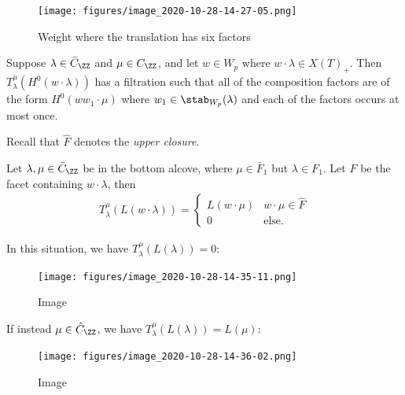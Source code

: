 \begin{figure}
\centering
\texttt{[image: figures/image\_2020-10-28-14-27-05.png]}
\caption{Weight where the translation has six factors}
\end{figure}

\begin{proposition}[?]

Suppose \(\lambda \in \bar{C}_\ZZ\) and \(\mu \in C_\ZZ\), and let
\(w\in W_p\) where \(w\cdot \lambda \in X(T)_+\). Then
\(T_\lambda^\mu (H^0(w\cdot \lambda))\) has a filtration such that all
of the composition factors are of the form \(H^0(ww_1 \cdot \mu)\) where
\(w_1\in \stab_{W_p}(\lambda)\) and each of the factors occurs at most
once.

\end{proposition}

Recall that \(\hat F\) denotes the \emph{upper closure}.

\begin{proposition}[?]

Let \(\lambda, \mu \in \bar{C}_\ZZ\) be in the bottom alcove, where
\(\mu \in \bar{F}_1\) but \(\lambda\in F_1\). Let \(F\) be the facet
containing \(w\cdot\lambda\), then
\begin{align*}  
T_\lambda^\mu(L(w\cdot \lambda)) = 
\begin{cases}
L(w\cdot \mu)  & w\cdot \mu \in \hat{F} \\
0 & \text{else}.
\end{cases}
\end{align*}

\end{proposition}

\begin{example}[?]

In this situation, we have \(T_\lambda^\mu(L(\lambda)) = 0\):

\begin{figure}
\centering
\texttt{[image: figures/image\_2020-10-28-14-35-11.png]}
\caption{Image}
\end{figure}

If instead \(\mu \in \hat{C}_\ZZ\), we have
\(T_\lambda^\mu( L(\lambda)) = L(\mu)\):

\begin{figure}
\centering
\texttt{[image: figures/image\_2020-10-28-14-36-02.png]}
\caption{Image}
\end{figure}

\end{example}

